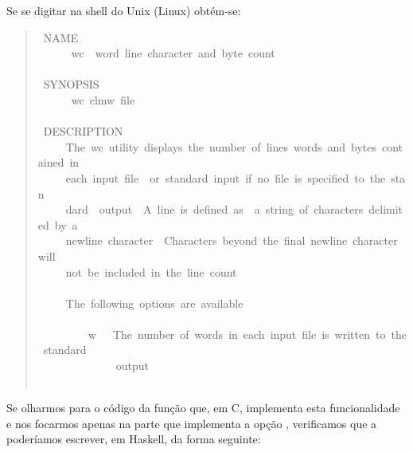 \documentclass[a4paper]{article}
\newcommand{\Varid}[1]{\mathit{#1}}
\begin{document}
Se se digitar \wc{\ensuremath{\Varid{man}\;\Varid{wc}}} na shell do Unix (Linux) obtém-se:
\begin{quote}\small
\begin{tabbing}\ttfamily
~NAME\\
\ttfamily ~~~~~~wc~~word~line~character~and~byte~count\\
\ttfamily ~\\
\ttfamily ~SYNOPSIS\\
\ttfamily ~~~~~~wc~clmw~file~\\
\ttfamily ~\\
\ttfamily ~DESCRIPTION\\
\ttfamily ~~~~~The~wc~utility~displays~the~number~of~lines~words~and~bytes~contained~in\\
\ttfamily ~~~~~each~input~file~~or~standard~input~if~no~file~is~specified~to~the~stan\\
\ttfamily ~~~~~dard~~output~~A~line~is~defined~as~~a~string~of~characters~delimited~by~a\\
\ttfamily ~~~~~newline~character~~Characters~beyond~the~final~newline~character~will\\
\ttfamily ~~~~~not~be~included~in~the~line~count\\
\ttfamily ~~~~~\\
\ttfamily ~~~~~The~following~options~are~available\\
\ttfamily ~~~~~\\
\ttfamily ~~~~~~~~~w~~~The~number~of~words~in~each~input~file~is~written~to~the~standard\\
\ttfamily ~~~~~~~~~~~~~~output\\
\ttfamily ~~~~~
\end{tabbing}
\end{quote}
Se olharmos para o código da função que, em C, implementa esta funcionalidade
\cite{KR78} e nos focarmos apenas na parte que implementa a opção ,
verificamos que a poderíamos escrever, em Haskell, da forma seguinte:
\end{document}
